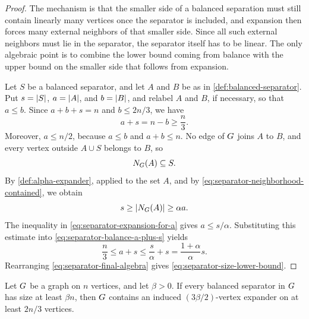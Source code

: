 \begin{proof}
	The mechanism is that the smaller side of a balanced separation must still contain linearly many vertices once the separator is included, and expansion then forces many external neighbors of that smaller side. Since all such external neighbors must lie in the separator, the separator itself has to be linear. The only algebraic point is to combine the lower bound coming from balance with the upper bound on the smaller side that follows from expansion.

	Let \(S\) be a balanced separator, and let \(A\) and \(B\) be as in \cref{def:balanced-separator}. Put \(s=\lvert S\rvert\), \(a=\lvert A\rvert\), and \(b=\lvert B\rvert\), and relabel \(A\) and \(B\), if necessary, so that \(a\leq b\). Since \(a+b+s=n\) and \(b\leq 2n/3\), we have
	\begin{equation}
		\label{eq:separator-balance-a-plus-s}
		a+s=n-b\geq \frac{n}{3}.
	\end{equation}
	Moreover, \(a\leq n/2\), because \(a\leq b\) and \(a+b\leq n\). No edge of \(G\) joins \(A\) to \(B\), and every vertex outside \(A\cup S\) belongs to \(B\), so
	\begin{equation}
		\label{eq:separator-neighborhood-contained}
		N_{G}(A)\subseteq S.
	\end{equation}
	By \cref{def:alpha-expander}, applied to the set \(A\), and by \cref{eq:separator-neighborhood-contained}, we obtain
	\begin{equation}
		\label{eq:separator-expansion-for-a}
		s\geq \lvert N_{G}(A)\rvert\geq \alpha a.
	\end{equation}
	The inequality in \cref{eq:separator-expansion-for-a} gives \(a\leq s/\alpha\). Substituting this estimate into \cref{eq:separator-balance-a-plus-s} yields
	\begin{equation}
		\label{eq:separator-final-algebra}
		\frac{n}{3}\leq a+s\leq \frac{s}{\alpha}+s=\frac{1+\alpha}{\alpha}s.
	\end{equation}
	Rearranging \cref{eq:separator-final-algebra} gives \cref{eq:separator-size-lower-bound}.
\end{proof}

\begin{proposition}
	\label{prop:large-separators-contain-large-expanders}
	Let \(G\) be a graph on \(n\) vertices, and let \(\beta>0\). If every balanced separator in \(G\) has size at least \(\beta n\), then \(G\) contains an induced \((3\beta/2)\)-vertex expander on at least \(2n/3\) vertices.
\end{proposition}

